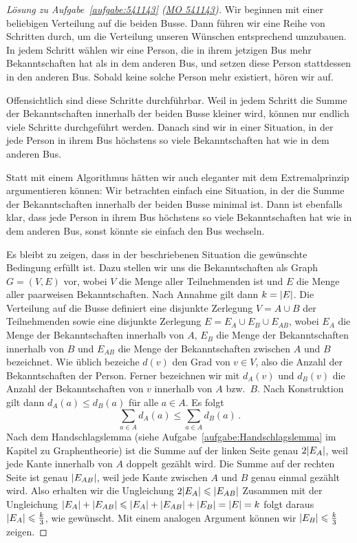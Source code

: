 \begin{proof}[Lösung zu Aufgabe~\ref{aufgabe:541143} \textmd{(\href{https://www.mathematik-olympiaden.de/moev/index.php?option=com_download&thema=a&format=raw&datei=A54114a.pdf}{MO 541143})}]
	Wir beginnen mit einer beliebigen Verteilung auf die beiden Busse. Dann führen wir eine Reihe von Schritten durch, um die Verteilung unseren Wünschen entsprechend umzubauen. In jedem Schritt wählen wir eine Person, die in ihrem jetzigen Bus mehr Bekanntschaften hat als in dem anderen Bus, und setzen diese Person stattdessen in den anderen Bus. Sobald keine solche Person mehr existiert, hören wir auf.
	
	Offensichtlich sind diese Schritte durchführbar. Weil in jedem Schritt die Summe der Bekanntschaften innerhalb der beiden Busse kleiner wird, können nur endlich viele Schritte durchgeführt werden. Danach sind wir in einer Situation, in der jede Person in ihrem Bus höchstens so viele Bekanntschaften hat wie in dem anderen Bus.
	
	Statt mit einem Algorithmus hätten wir auch eleganter mit dem Extremalprinzip argumentieren können: Wir betrachten einfach eine Situation, in der die Summe der Bekanntschaften innerhalb der beiden Busse minimal ist. Dann ist ebenfalls klar, dass jede Person in ihrem Bus höchstens so viele Bekanntschaften hat wie in dem anderen Bus, sonst könnte sie einfach den Bus wechseln.
	
	Es bleibt zu zeigen, dass in der beschriebenen Situation die gewünschte Bedingung erfüllt ist. Dazu stellen wir uns die Bekanntschaften als Graph $G=(V,E)$ vor, wobei $V$ die Menge aller Teilnehmenden ist und $E$ die Menge aller paarweisen Bekanntschaften. Nach Annahme gilt dann $k=\lvert E\rvert$. Die Verteilung auf die Busse definiert eine disjunkte Zerlegung $V=A\cup B$ der Teilnehmenden sowie eine disjunkte Zerlegung $E=E_A\cup E_B\cup E_{AB}$, wobei $E_A$ die Menge der Bekanntschaften innerhalb von $A$, $E_B$ die Menge der Bekanntschaften innerhalb von $B$ und $E_{AB}$ die Menge der Bekanntschaften zwischen $A$ und $B$ bezeichnet. Wie üblich bezeiche $d(v)$ den Grad von $v\in V$, also die Anzahl der Bekanntschaften der Person. Ferner bezeichnen wir mit $d_A(v)$ und $d_B(v)$ die Anzahl der Bekanntschaften von $v$ innerhalb von $A$ bzw.\ $B$. Nach Konstruktion gilt dann $d_A(a)\leqslant d_B(a)$ für alle $a\in A$. Es folgt
	\begin{equation*}
		\sum_{a\in A}d_A(a)\leqslant \sum_{a\in A}d_B(a)\,.
	\end{equation*}
	Nach dem Handschlagslemma (siehe Aufgabe~\ref{aufgabe:Handschlagslemma} im Kapitel zu Graphentheorie) ist die Summe auf der linken Seite genau $2\lvert E_A\rvert$, weil jede Kante innerhalb von $A$ doppelt gezählt wird. Die Summe auf der rechten Seite ist genau $\lvert E_{AB}\rvert$, weil jede Kante zwischen $A$ und $B$ genau einmal gezählt wird. Also erhalten wir die Ungleichung $2\lvert E_A\rvert\leqslant \lvert E_{AB}\rvert$ Zusammen mit der Ungleichung $\lvert E_A\rvert+\lvert E_{AB}\rvert\leqslant \lvert E_A\rvert+\lvert E_{AB}\rvert+\lvert E_B\rvert=\lvert E\rvert=k$ folgt daraus $\lvert E_A\rvert\leqslant \frac k3$, wie gewünscht. Mit einem analogen Argument können wir $\lvert E_B\rvert\leqslant \frac k3$ zeigen.
\end{proof}